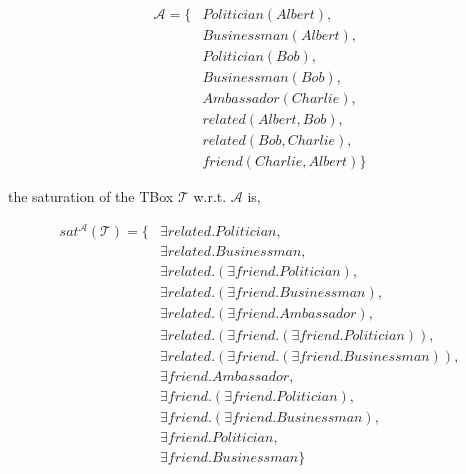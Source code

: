 \begin{equation*}
    \begin{aligned}
        \mathcal{A} = \{ & Politician(Albert),     \\
                         & Businessman(Albert),    \\
                         & Politician(Bob),        \\
                         & Businessman(Bob),       \\
                         & Ambassador(Charlie),    \\
                         & related(Albert, Bob),   \\
                         & related(Bob, Charlie),  \\ 
                         & friend(Charlie, Albert) \}
    \end{aligned}
\end{equation*}

the saturation of the TBox $\mathcal{T}$ w.r.t. $\mathcal{A}$ is,

\begin{equation*}
    \begin{aligned}
        sat^{\mathcal{A}}(\mathcal{T}) = \{ & \exists related.Politician,  \\
                                            & \exists related.Businessman, \\
                                            & \exists related.(\exists friend.Politician),  \\
                                            & \exists related.(\exists friend.Businessman), \\
                                            & \exists related.(\exists friend.Ambassador),  \\
                                            & \exists related.(\exists friend.(\exists friend.Politician)),  \\
                                            & \exists related.(\exists friend.(\exists friend.Businessman)), \\
                                            & \exists friend.Ambassador, \\
                                            & \exists friend.(\exists friend.Politician),  \\
                                            & \exists friend.(\exists friend.Businessman), \\
                                            & \exists friend.Politician, \\
                                            & \exists friend.Businessman \} 
    \end{aligned}
\end{equation*}

